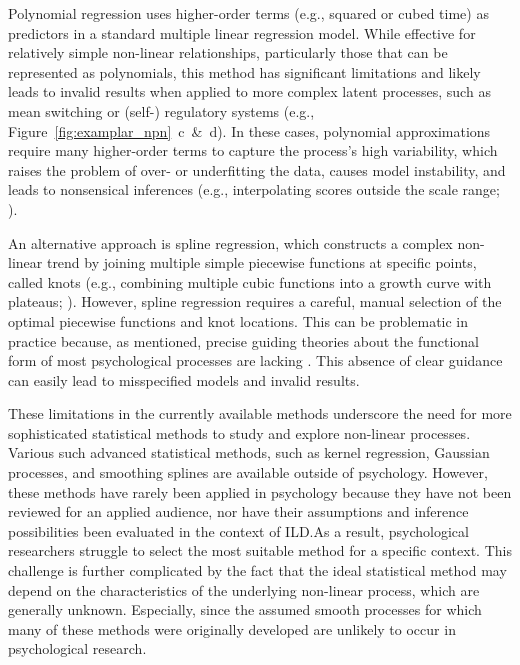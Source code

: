 \documentclass[man, floatsintext]{apa7}
\begin{document}
Polynomial regression \parencite{jebb_time_2015} uses higher-order terms
(e.g., squared or cubed time) as predictors in a standard multiple linear
regression model. While effective for relatively simple non-linear
relationships,
particularly those that can be represented as polynomials, this method has
significant limitations and likely leads to invalid results when applied to
more complex latent processes, such as mean switching or (self-) regulatory
systems (e.g., Figure~\ref{fig:examplar_npn}~c~\&~d). In these cases,
polynomial approximations require many higher-order
terms to capture the process's high variability, which raises the problem of
over- or underfitting the data, causes model instability, and leads to
nonsensical inferences (e.g., interpolating scores outside the scale range;
\textcite{boyd_divergence_2009,harrell_general_2001}).

An alternative approach is spline regression, which constructs a complex
non-linear trend by joining multiple simple piecewise functions at specific
points, called knots (e.g., combining multiple cubic functions into a growth
curve with plateaus; \textcite{tsay_nonlinear_2019}). However, spline
regression requires a careful, manual selection of the optimal piecewise
functions and
knot locations. This can be problematic in practice because, as mentioned,
precise guiding theories about the functional form of most psychological
processes are lacking \parencite{tan_time-varying_2011}. This absence of clear
guidance can easily lead to misspecified models and invalid results.

These limitations in the currently available methods underscore the need for
more sophisticated statistical methods to study and explore non-linear
processes. Various such advanced statistical
methods, such as kernel regression, Gaussian processes, and smoothing splines
are available outside of psychology. However, these
methods have rarely been applied in psychology because they have not been
reviewed for an applied audience, nor have their assumptions and inference
possibilities been evaluated in the context of ILD.\@ As a result,
psychological researchers struggle to select the most suitable method for a
specific context. This challenge is further complicated by the fact that the
ideal statistical method may depend on the characteristics of the underlying
non-linear process, which are generally unknown. Especially, since the assumed
smooth processes for which many of these methods were originally developed are
unlikely to occur in psychological research.
\end{document}
